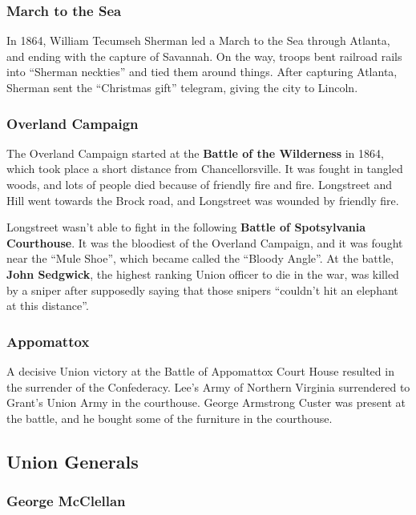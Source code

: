 \subsubsection*{March to the Sea}

In 1864, William Tecumseh Sherman led a March to the Sea through Atlanta, and ending with the capture of Savannah.
On the way, troops bent railroad rails into ``Sherman neckties'' and tied them around things.
After capturing Atlanta, Sherman sent the ``Christmas gift'' telegram, giving the city to Lincoln.

\subsubsection*{Overland Campaign}

The Overland Campaign started at the \textbf{Battle of the Wilderness} in 1864,
which took place a short distance from Chancellorsville.
It was fought in tangled woods, and lots of people died because of friendly fire and fire.
Longstreet and Hill went towards the Brock road, and Longstreet was wounded by friendly fire.

Longstreet wasn't able to fight in the following \textbf{Battle of Spotsylvania Courthouse}.
It was the bloodiest of the Overland Campaign, and it was fought near the ``Mule Shoe'',
which became called the ``Bloody Angle''.
At the battle, \textbf{John Sedgwick}, the highest ranking Union officer to die in the war,
was killed by a sniper after supposedly saying that those snipers ``couldn't hit an elephant at this distance''.

\subsubsection*{Appomattox}

A decisive Union victory at the Battle of Appomattox Court House resulted in the surrender of the Confederacy.
Lee's Army of Northern Virginia surrendered to Grant's Union Army in the courthouse.
George Armstrong Custer was present at the battle, and he bought some of the furniture in the courthouse.

\subsection*{Union Generals}

\subsubsection*{George McClellan}

